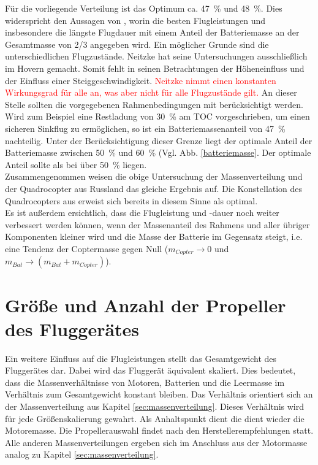 Für die vorliegende Verteilung ist das Optimum ca. \SI{47}{\%} und \SI{48}{\%}. 
Dies widerspricht den Aussagen von \cite{Neitzke.2013}, worin die besten Flugleistungen und insbesondere die längste Flugdauer mit einem Anteil der Batteriemasse an der Gesamtmasse von 2/3 angegeben wird. Ein möglicher Grunde sind die unterschiedlichen Flugzustände. Neitzke hat seine Untersuchungen ausschließlich im Hovern gemacht. Somit fehlt in seinen Betrachtungen der Höheneinfluss und der Einfluss einer Steiggeschwindigkeit. \textcolor{red}{Neitzke nimmt einen konstanten Wirkungsgrad für alle an, was aber nicht für alle Flugzustände gilt.}
An dieser Stelle sollten die vorgegebenen Rahmenbedingungen mit berücksichtigt werden. Wird zum Beispiel eine Restladung von \SI{30}{\%} am TOC vorgeschrieben, um einen sicheren Sinkflug zu ermöglichen, so ist ein Batteriemassenanteil von \SI{47}{\%} nachteilig. Unter der Berücksichtigung dieser Grenze liegt der optimale Anteil der Batteriemasse zwischen \SI{50}{\%} und \SI{60}{\%} (Vgl. Abb. \ref{batteriemasse}. Der optimale Anteil sollte als bei über \SI{50}{\%} liegen.\\
Zusammengenommen weisen die obige Untersuchung der Massenverteilung und der Quadrocopter aus Russland das gleiche Ergebnis auf. Die Konstellation des Quadrocopters aus \cite{Anderson.2018} erweist sich bereits in diesem Sinne als optimal.\\
Es ist außerdem ersichtlich, dass die Flugleistung und -dauer noch weiter verbessert werden können, wenn der Massenanteil des Rahmens und aller übriger Komponenten kleiner wird und die Masse der Batterie im Gegensatz steigt, i.e. eine Tendenz der Coptermasse gegen Null (\ensuremath{m_{Copter}\rightarrow 0} und \ensuremath{m_{Bat}\rightarrow (m_{Bat}+m_{Copter})}).



\section{Größe und Anzahl der Propeller des Fluggerätes}
\label{sec:groesse}
Ein weitere Einfluss auf die Flugleistungen stellt das Gesamtgewicht des Fluggerätes dar. Dabei wird das Fluggerät äquivalent skaliert. Dies bedeutet, dass die Massenverhältnisse von Motoren, Batterien und die Leermasse im Verhältnis zum Gesamtgewicht konstant bleiben. Das Verhältnis orientiert sich an der Massenverteilung aus Kapitel \ref{sec:massenverteilung}. Dieses Verhältnis wird für jede Größenskalierung gewahrt. Als Anhaltspunkt dient die dient wieder die Motoremasse. Die Propellerauswahl findet nach den Herstellerempfehlungen statt. Alle anderen Massenverteilungen ergeben sich im Anschluss aus der Motormasse analog zu Kapitel \ref{sec:massenverteilung}.

